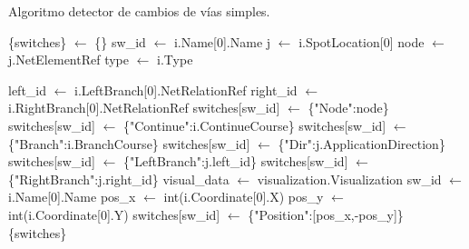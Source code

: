     \begin{algorithm}[H]
		\caption{Algoritmo detector de cambios de vías simples.}
        \label{alg:switches_1}
        \begin{algorithmic}
            \STATE \{switches\} $\gets$ \{\}
                        \STATE sw\_id $\gets$ i.Name[0].Name
                        \STATE j $\gets$ i.SpotLocation[0]
                        \STATE node $\gets$ j.NetElementRef
                        \STATE type $\gets$ i.Type
                      
                           	\STATE left\_id $\gets$ i.LeftBranch[0].NetRelationRef
                           	\STATE right\_id $\gets$ i.RightBranch[0].NetRelationRef
                           	\STATE switches[sw\_id] $\gets$ \{"Node":node\}
                           	\STATE switches[sw\_id] $\gets$ \{"Continue":i.ContinueCourse\}
                           	\STATE switches[sw\_id] $\gets$ \{"Branch":i.BranchCourse\}
                           	\STATE switches[sw\_id] $\gets$ \{"Dir":j.ApplicationDirection\}
                           	\STATE switches[sw\_id] $\gets$ \{"LeftBranch":j.left\_id\}
                           	\STATE switches[sw\_id] $\gets$ \{"RightBranch":j.right\_id\}
                        \ENDIF                        
                    \ENDIF
                \ENDFOR
            \ENDIF
            \STATE visual\_data $\gets$ visualization.Visualization
                    \STATE sw\_id $\gets$ i.Name[0].Name
                        \STATE pos\_x $\gets$ int(i.Coordinate[0].X)
                        \STATE pos\_y $\gets$ int(i.Coordinate[0].Y)
                        \STATE switches[sw\_id] $\gets$ \{"Position":[pos\_x,-pos\_y]\}
                    \ENDIF 
                \ENDFOR
            \ENDIF
        \OUTPUT \{switches\}
        \end{algorithmic}
    \end{algorithm}
    
